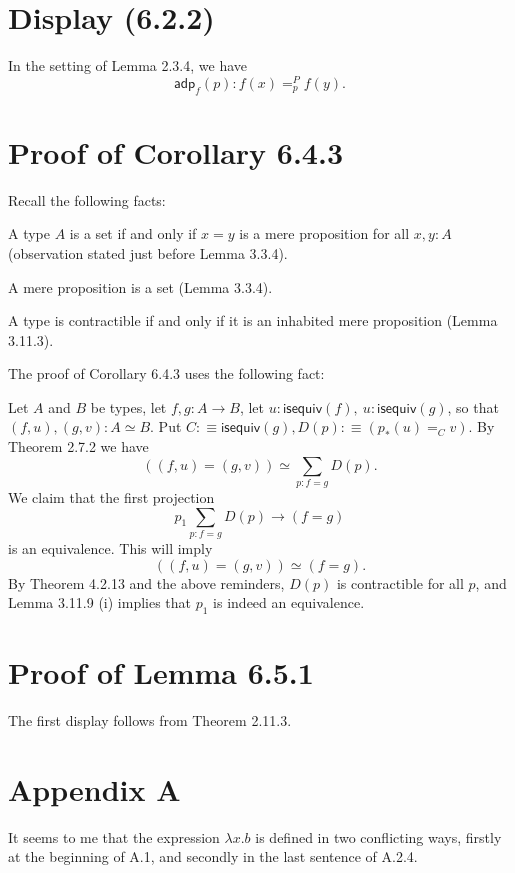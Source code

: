 \documentclass[12pt]{article}
\newcommand{\msf}{\mathsf}
\begin{document}

\section{Display (6.2.2)}

In the setting of Lemma 2.3.4, we have 
$$
\msf{adp}_f(p):f(x)=^P_pf(y).
$$


\section{Proof of Corollary 6.4.3}

Recall the following facts: 

A type $A$ is a set if and only if $x=y$ is a mere proposition for all $x,y:A$ (observation stated just before Lemma 3.3.4). 

A mere proposition is a set (Lemma 3.3.4).

A type is contractible if and only if it is an inhabited mere proposition (Lemma 3.11.3). 

The proof of Corollary 6.4.3 uses the following fact:

Let $A$ and $B$ be types, let $f,g:A\to B$, let $u:\mathsf{isequiv}(f),\ u:\mathsf{isequiv}(g)$, so that $(f,u),(g,v):A\simeq B$. Put $C:\equiv\mathsf{isequiv}(g), D(p):\equiv(p_*(u)=_Cv)$. By Theorem 2.7.2 we have 
$$
((f,u)=(g,v))\simeq\sum_{p:f=g}D(p).
$$ 
We claim that the first projection 
$$
p_1\sum_{p:f=g}D(p)\to(f=g)
$$ 
is an equivalence. This will imply 
$$
((f,u)=(g,v))\simeq(f=g).
$$ 
By Theorem 4.2.13 and the above reminders, $D(p)$ is contractible for all $p$, and Lemma 3.11.9 (i) implies that $p_1$ is indeed an equivalence.


\section{Proof of Lemma 6.5.1}

The first display follows from Theorem 2.11.3.


\section{Appendix A}

It seems to me that the expression $\lambda x.b$ is defined in two conflicting ways, firstly at the beginning of A.1, and secondly in the last sentence of A.2.4. 
\end{document}

